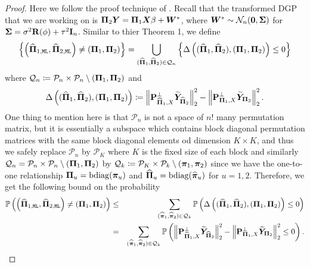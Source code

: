 \documentclass[numsec,webpdf,modern,medium,namedate]{oup-authoring-template}
\theoremstyle{thmstyleone}%
\theoremstyle{thmstyletwo}%
\theoremstyle{thmstylethree}%
\begin{document}
\begin{proof}
    Here we follow the proof technique of \cite{pananjady2017linear}. Recall that the transformed DGP that we are working on is $\boldsymbol{\Pi}_2 \boldsymbol{Y}  =  \boldsymbol{\Pi}_1 \boldsymbol{X} \beta + \boldsymbol{W}^\ast$, where $\boldsymbol{W}^\ast \sim \mathcal{N}_n(\boldsymbol{0}, \boldsymbol{\Sigma})$ for $\boldsymbol{\Sigma} = \sigma^2\mathbf{R}(\phi) + \tau^2\mathbf{I}_n$. Similar to thier Theorem 1, we define
    \begin{equation*}
        \left\{ \left( \widehat{\boldsymbol{\Pi}}_{1, \texttt{ML}}, \widehat{\boldsymbol{\Pi}}_{2, \texttt{ML}} \right) \neq \left( \boldsymbol{\Pi}_1, \boldsymbol{\Pi}_2 \right) \right\} = \bigcup_{(\widehat{\boldsymbol{\Pi}}_1, \widehat{\boldsymbol{\Pi}}_2 ) \in \mathcal{Q}_n } \left\{ \Delta \left( (\widehat{\boldsymbol{\Pi}}_1, \widehat{\boldsymbol{\Pi}}_2 ), \left( \boldsymbol{\Pi}_1, \boldsymbol{\Pi}_2 \right) \right) \leq 0 \right\}
    \end{equation*}
    where $\mathcal{Q}_n \coloneqq \mathcal{P}_n \times \mathcal{P}_n \setminus \left( \boldsymbol{\Pi}_1, \boldsymbol{\Pi}_2 \right)$ and
    \begin{equation*}
        \Delta \left( (\widehat{\boldsymbol{\Pi}}_1, \widehat{\boldsymbol{\Pi}}_2 ), \left( \boldsymbol{\Pi}_1, \boldsymbol{\Pi}_2 \right) \right) \coloneqq \left\|\mathbf{P}_{\widehat{\boldsymbol{\Pi}}_1, X}^\perp \widetilde{\boldsymbol{Y}}_{\widehat{\boldsymbol{\Pi}}_2}\right\|_2^2 - \left\|\mathbf{P}_{\boldsymbol{\Pi}_1, X}^\perp \widetilde{\boldsymbol{Y}}_{\boldsymbol{\Pi}_2}\right\|_2^2.
    \end{equation*}    
    One thing to mention here is that $\mathcal{P}_n$ is not a space of $n!$ many permutation matrix, but it is essentially a subspace which contains block diagonal permutation matrices with the same block diagonal elements od dimension $K \times K$, and thus we safely replace $\mathcal{P}_n$ by $\mathcal{P}_K$ where $K$ is the fixed size of each block and similarly $\mathcal{Q}_n = \mathcal{P}_n \times \mathcal{P}_n \setminus \left( \boldsymbol{\Pi}_1, \boldsymbol{\Pi}_2 \right)$ by $\mathcal{Q}_k \coloneqq \mathcal{P}_K \times \mathcal{P}_k \setminus \left( \boldsymbol{\pi}_1, \boldsymbol{\pi}_2 \right)$ since we have the one-to-one relationship $\boldsymbol{\Pi}_u = \mathrm{bdiag}(\boldsymbol{\pi}_u)$ and $\widehat{\boldsymbol{\Pi}}_u = \mathrm{bdiag}(\widehat{\boldsymbol{\pi}}_u)$ for $u = 1,2$.
    Therefore, we get the following bound on the probability
    {\footnotesize
    \begin{eqnarray}\label{eq:hatpi_neq_pi_ub}
        \mathbb{P} \left( \left( \hatPi_{1, \texttt{ML}}, \hatPi_{2, \texttt{ML}} \right) \neq \left( \bPi_1, \bPi_2 \right) \right) & \leq & \sum_{(\hatpi_1, \hatpi_2 ) \in \calQ_k} \mathbb{P} \left( \Delta \left( (\hatPi_1, \hatPi_2 ), \left( \bPi_1, \bPi_2 \right) \right) \leq 0  \right) \notag \\
        & = & \sum_{(\hatpi_1, \hatpi_2 ) \in \calQ_k} \mathbb{P} \left( \left\|\bP_{\hatPi_1, X}^\perp \widetilde{\bY}_{\hatPi_2}\right\|_2^2 - \left\|\bP_{\bPi_1, X}^\perp \widetilde{\bY}_{\bPi_2}\right\|_2^2 \leq 0  \right).

\end{eqnarray}}
\end{proof}
\end{document}
